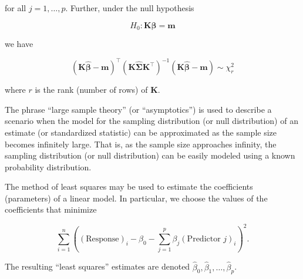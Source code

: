 \documentclass[
  letterpaper,
  DIV=11,
  numbers=noendperiod]{scrreprt}
\providecommand{\tightlist}{%
  \setlength{\itemsep}{0pt}\setlength{\parskip}{0pt}}\usepackage{longtable,booktabs,array}
\theoremstyle{definition}
\theoremstyle{definition}
\theoremstyle{remark}
\begin{document}
for all \(j = 1, \dotsc, p\). Further, under the null hypothesis

\[H_0: \mathbf{K}\boldsymbol{\beta} = \mathbf{m}\]

we have

\[\left(\mathbf{K}\widehat{\boldsymbol{\beta}} - \mathbf{m}\right)^\top \left(\mathbf{K}\widehat{\boldsymbol{\Sigma}}\mathbf{K}^\top\right)^{-1} \left(\mathbf{K}\widehat{\boldsymbol{\beta}} - \mathbf{m}\right) \sim \chi^2_r\]

where \(r\) is the rank (number of rows) of \(\mathbf{K}\).

\begin{description}
\tightlist
\item[Large Sample Theory (Definition~\ref{def-large-sample-theory})]
The phrase ``large sample theory'' (or ``asymptotics'') is used to
describe a scenario when the model for the sampling distribution (or
null distribution) of an estimate (or standardized statistic) can be
approximated as the sample size becomes infinitely large. That is, as
the sample size approaches infinity, the sampling distribution (or null
distribution) can be easily modeled using a known probability
distribution.
\item[Least Squares Estimation (Definition~\ref{def-least-squares})]
The method of least squares may be used to estimate the coefficients
(parameters) of a linear model. In particular, we choose the values of
the coefficients that minimize
\end{description}

\[\sum\limits_{i=1}^{n} \left((\text{Response})_i - \beta_0 - \sum\limits_{j=1}^{p} \beta_j (\text{Predictor } j)_{i}\right)^2.\]

The resulting ``least squares'' estimates are denoted
\(\widehat{\beta}_0, \widehat{\beta}_1, \dotsc, \widehat{\beta}_p\).
\end{document}

